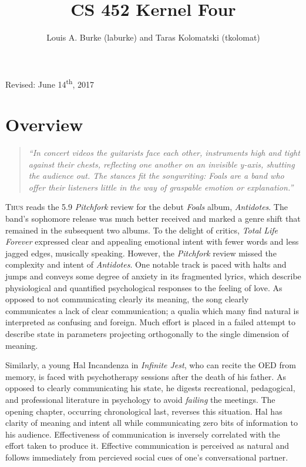 \documentclass{amsart}
\title{CS 452 Kernel Four \vspace{-0.65cm}}
\date{Louis A. Burke (laburke) and Taras Kolomatski (tkolomat)}
\begin{document}
\maketitle

\begin{center}
\vspace{-0.58cm}
Revised: June 14\textsuperscript{th}, 2017
\end{center}

\section*{Overview}

\begin{quote}\textit{
``In concert videos the guitarists face each other, instruments high and
tight against their chests, reflecting one another on an invisible y-axis,
shutting the audience out. The stances fit the songwriting: Foals are a band
who offer their listeners little in the way of graspable emotion or
explanation.''} \end {quote}

\textsc{Thus} reads the 5.9 \textit{Pitchfork}
review for the debut \textit{Foals} album, \textit{Antidotes}. The band's
sophomore release was much better received and marked a genre shift that
remained in the subsequent two albums. To the delight of critics,
\textit{Total Life Forever} expressed clear and appealing emotional intent
with fewer words and less jagged edges, musically speaking. However, the
\textit{Pitchfork} review missed the complexity and intent of
\textit{Antidotes}. One notable track is paced with halts and jumps and
conveys some degree of anxiety in its fragmented lyrics, which describe
physiological and quantified psychological responses to the feeling of love.
As opposed to not communicating clearly its meaning, the song clearly
communicates a lack of clear communication; a qualia which many find natural
is interpreted as confusing and foreign. Much effort is placed in a failed
attempt to describe state in parameters projecting orthogonally to the
single dimension of meaning.

Similarly, a young Hal Incandenza in \textit{Infinite Jest}, who can recite the
OED from memory, is faced with psychotherapy sessions after the death of his
father. As opposed to clearly communicating his state, he digests
recreational, pedagogical, and professional literature in psychology to
avoid \textit{failing} the meetings. The opening chapter, occurring
chronological last, reverses this situation. Hal has clarity of meaning and
intent all while communicating zero bits of information to his audience.
Effectiveness of communication is inversely correlated with the effort taken
to produce it. Effective communication is perceived as natural and follows
immediately from percieved social cues of one's conversational partner.
\end{document}
